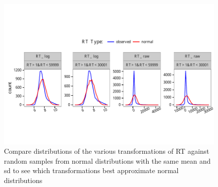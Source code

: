 \documentclass[a4paper,12pt]{article}\usepackage[]{graphicx}\usepackage[]{color}
\makeatletter
\def\maxwidth{ %
  \ifdim\Gin@nat@width>\linewidth
    \linewidth
  \else
    \Gin@nat@width
  \fi
}
\newenvironment{knitrout}{}{} %
\makeatother
\begin{document}
\begin{knitrout}\scriptsize
{}\color{fgcolor}\begin{figure}[hbtp]

{\centering \includegraphics[width=\maxwidth]{figure/graphics-plotDistFreqPolys-1} 

}

\caption[Compare distributions of the various transformations of RT against random samples from normal distributions with the same mean and sd to see which transformations best approximate normal distributions]{Compare distributions of the various transformations of RT against random samples from normal distributions with the same mean and sd to see which transformations best approximate normal distributions}\label{fig:plotDistFreqPolys}
\end{figure}


\end{knitrout}

\clearpage
\end{document}
